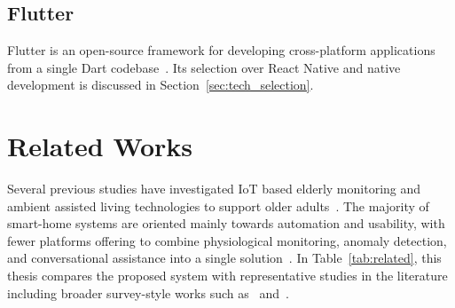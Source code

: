 \subsection{Flutter}

Flutter is an open-source framework for developing cross-platform applications from a single Dart codebase~\cite{Flutter2023}. Its selection over React Native and native development is discussed in Section~\ref{sec:tech_selection}.

\section{Related Works}
\label{sec:related}

Several previous studies have investigated IoT based elderly monitoring and ambient assisted living technologies to support older adults~\cite{Rashidi2013,Liu2016}. The majority of smart-home systems are oriented mainly towards automation and usability, with fewer platforms offering to combine physiological monitoring, anomaly detection, and conversational assistance into a single solution~\cite{Stolojescu2021,Morita2023}. In Table~\ref{tab:related}, this thesis compares the proposed system with representative studies in the literature including broader survey-style works such as~\cite{Ali2025} and~\cite{Morita2023}.

